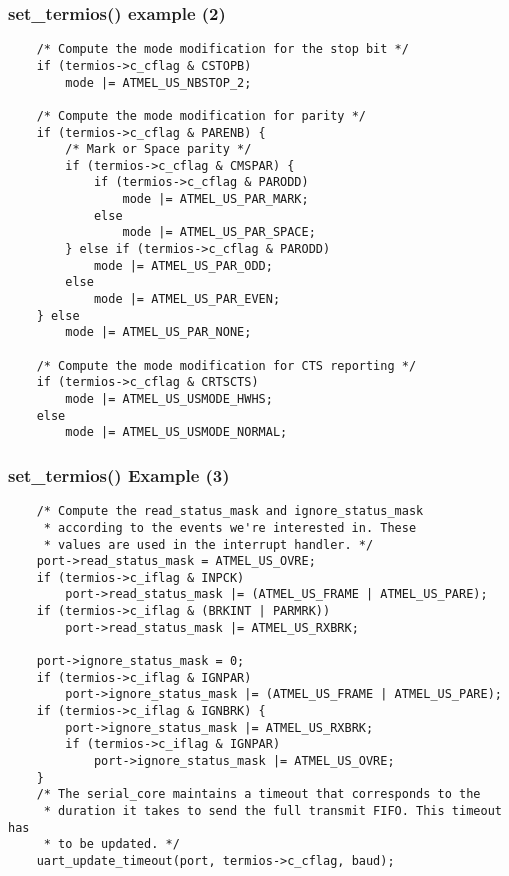 \begin{frame}[fragile]
  \frametitle{set\_termios() example (2)}
\begin{verbatim}
    /* Compute the mode modification for the stop bit */
    if (termios->c_cflag & CSTOPB)
        mode |= ATMEL_US_NBSTOP_2;

    /* Compute the mode modification for parity */
    if (termios->c_cflag & PARENB) {
        /* Mark or Space parity */
        if (termios->c_cflag & CMSPAR) {
            if (termios->c_cflag & PARODD)
                mode |= ATMEL_US_PAR_MARK;
            else
                mode |= ATMEL_US_PAR_SPACE;
        } else if (termios->c_cflag & PARODD)
            mode |= ATMEL_US_PAR_ODD;
        else
            mode |= ATMEL_US_PAR_EVEN;
    } else
        mode |= ATMEL_US_PAR_NONE;

    /* Compute the mode modification for CTS reporting */
    if (termios->c_cflag & CRTSCTS)
        mode |= ATMEL_US_USMODE_HWHS;
    else
        mode |= ATMEL_US_USMODE_NORMAL;
\end{verbatim}
\end{frame}

\begin{frame}[fragile]
  \frametitle{set\_termios() Example (3)}
\begin{verbatim}
    /* Compute the read_status_mask and ignore_status_mask
     * according to the events we're interested in. These
     * values are used in the interrupt handler. */
    port->read_status_mask = ATMEL_US_OVRE;
    if (termios->c_iflag & INPCK)
        port->read_status_mask |= (ATMEL_US_FRAME | ATMEL_US_PARE);
    if (termios->c_iflag & (BRKINT | PARMRK))
        port->read_status_mask |= ATMEL_US_RXBRK;

    port->ignore_status_mask = 0;
    if (termios->c_iflag & IGNPAR)
        port->ignore_status_mask |= (ATMEL_US_FRAME | ATMEL_US_PARE);
    if (termios->c_iflag & IGNBRK) {
        port->ignore_status_mask |= ATMEL_US_RXBRK;
        if (termios->c_iflag & IGNPAR)
            port->ignore_status_mask |= ATMEL_US_OVRE;
    }
    /* The serial_core maintains a timeout that corresponds to the
     * duration it takes to send the full transmit FIFO. This timeout has
     * to be updated. */
    uart_update_timeout(port, termios->c_cflag, baud);
\end{verbatim}
\end{frame}

